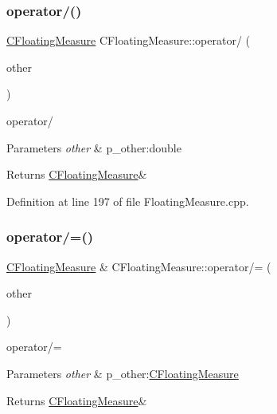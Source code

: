 \subsubsection{\texorpdfstring{operator/()}{operator/()}\hspace{0.1cm}{\footnotesize\ttfamily [2/2]}}
{\footnotesize\ttfamily \hyperlink{classCFloatingMeasure}{C\+Floating\+Measure} C\+Floating\+Measure\+::operator/ (\begin{DoxyParamCaption}\item[{const double \&}]{other }\end{DoxyParamCaption})}



operator/ 


\begin{DoxyParams}{Parameters}
{\em other} & p\+\_\+other\+:double \\
\hline
\end{DoxyParams}
\begin{DoxyReturn}{Returns}
\hyperlink{classCFloatingMeasure}{C\+Floating\+Measure}\& 
\end{DoxyReturn}


Definition at line 197 of file Floating\+Measure.\+cpp.

\mbox{\label{classCFloatingMeasure_a1bc972be1fa5abd0619849710eef398c}} 
\subsubsection{\texorpdfstring{operator/=()}{operator/=()}\hspace{0.1cm}{\footnotesize\ttfamily [1/2]}}
{\footnotesize\ttfamily \hyperlink{classCFloatingMeasure}{C\+Floating\+Measure} \& C\+Floating\+Measure\+::operator/= (\begin{DoxyParamCaption}\item[{const \hyperlink{classCFloatingMeasure}{C\+Floating\+Measure} \&}]{other }\end{DoxyParamCaption})}



operator/= 


\begin{DoxyParams}{Parameters}
{\em other} & p\+\_\+other\+:\hyperlink{classCFloatingMeasure}{C\+Floating\+Measure} \\
\hline
\end{DoxyParams}
\begin{DoxyReturn}{Returns}
\hyperlink{classCFloatingMeasure}{C\+Floating\+Measure}\& 
\end{DoxyReturn}



